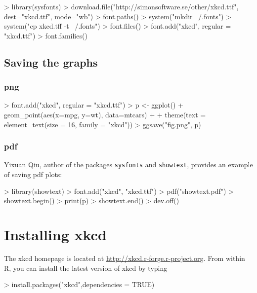 \documentclass[10pt]{article}
\begin{document}
\begin{Schunk}
\begin{Sinput}
> library(sysfonts)
> download.file("http://simonsoftware.se/other/xkcd.ttf", dest="xkcd.ttf", mode="wb")
> font.paths()
> system("mkdir ~/.fonts")
> system("cp xkcd.tff -t ~/.fonts")
> font.files()
> font.add("xkcd",  regular = "xkcd.ttf")
> font.families()
\end{Sinput}
\end{Schunk}



\subsection{Saving the graphs}

\subsubsection{png}

\begin{Schunk}
\begin{Sinput}
> font.add("xkcd",  regular = "xkcd.ttf")
> p <-  ggplot() + geom_point(aes(x=mpg, y=wt), data=mtcars) + 
+   theme(text = element_text(size = 16, family = "xkcd"))
> ggsave("fig.png", p)
\end{Sinput}
\end{Schunk}

\subsubsection{pdf}
Yixuan Qiu, author of the packages \texttt{sysfonts} and \texttt{showtext}, provides an example of saving pdf plots:

\begin{Schunk}
\begin{Sinput}
> library(showtext)
> font.add("xkcd", "xkcd.ttf")
> pdf("showtext.pdf")
> showtext.begin()
> print(p)
> showtext.end()
> dev.off()
\end{Sinput}
\end{Schunk}




\section{Installing xkcd}

The xkcd homepage is located at \url{http://xkcd.r-forge.r-project.org}. 
From within R, you can install the latest version of xkcd by typing 
\begin{Schunk}
\begin{Sinput}
> install.packages("xkcd",dependencies = TRUE)
\end{Sinput}
\end{Schunk}
\end{document}
